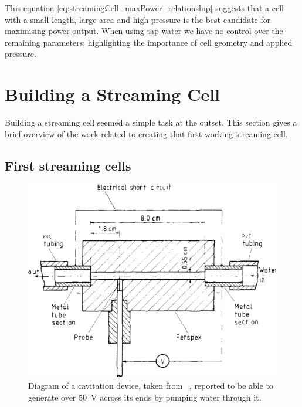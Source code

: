       This equation \eqref{eq:streamingCell_maxPower_relationship} suggests that a cell with a small length, large area and high pressure is the best candidate for maximising power output.
      When using tap water we have no control over the remaining parameters; highlighting the importance of cell geometry and applied pressure.


\section{Building a Streaming Cell}


  Building a streaming cell seemed a simple task at the outset.
  This section gives a brief overview of the work related to creating that first working streaming cell.


  \subsection{First streaming cells}


    \begin{figure}
      \centering
      \includegraphics{content/pt1/01-PowerHarvesting/graphics/VargaSeymour1986_cell}
      \caption{\label{fig:first_cell_diagram}Diagram of a cavitation device, taken from ~\cite{Varga1986}, reported to be able to generate over \SI{50}{\volt} across its ends by pumping water through it.}
    \end{figure}

